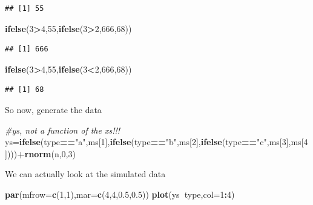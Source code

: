 \documentclass[
]{book}
\newenvironment{Shaded}{\begin{snugshade}}{\end{snugshade}}
\newcommand{\CommentTok}[1]{\textcolor[rgb]{0.56,0.35,0.01}{\textit{#1}}}
\newcommand{\DataTypeTok}[1]{\textcolor[rgb]{0.13,0.29,0.53}{#1}}
\newcommand{\DecValTok}[1]{\textcolor[rgb]{0.00,0.00,0.81}{#1}}
\newcommand{\FloatTok}[1]{\textcolor[rgb]{0.00,0.00,0.81}{#1}}
\newcommand{\KeywordTok}[1]{\textcolor[rgb]{0.13,0.29,0.53}{\textbf{#1}}}
\newcommand{\NormalTok}[1]{#1}
\newcommand{\OperatorTok}[1]{\textcolor[rgb]{0.81,0.36,0.00}{\textbf{#1}}}
\newcommand{\StringTok}[1]{\textcolor[rgb]{0.31,0.60,0.02}{#1}}
\begin{document}
\begin{verbatim}
## [1] 55
\end{verbatim}

\begin{Shaded}
\begin{Highlighting}[]
\KeywordTok{ifelse}\NormalTok{(}\DecValTok{3}\OperatorTok{>}\DecValTok{4}\NormalTok{,}\DecValTok{55}\NormalTok{,}\KeywordTok{ifelse}\NormalTok{(}\DecValTok{3}\OperatorTok{>}\DecValTok{2}\NormalTok{,}\DecValTok{666}\NormalTok{,}\DecValTok{68}\NormalTok{))}
\end{Highlighting}
\end{Shaded}

\begin{verbatim}
## [1] 666
\end{verbatim}

\begin{Shaded}
\begin{Highlighting}[]
\KeywordTok{ifelse}\NormalTok{(}\DecValTok{3}\OperatorTok{>}\DecValTok{4}\NormalTok{,}\DecValTok{55}\NormalTok{,}\KeywordTok{ifelse}\NormalTok{(}\DecValTok{3}\OperatorTok{<}\DecValTok{2}\NormalTok{,}\DecValTok{666}\NormalTok{,}\DecValTok{68}\NormalTok{))}
\end{Highlighting}
\end{Shaded}

\begin{verbatim}
## [1] 68
\end{verbatim}

So now, generate the data

\begin{Shaded}
\begin{Highlighting}[]
\CommentTok{#ys, not a function of the xs!!!}
\NormalTok{ys=}\KeywordTok{ifelse}\NormalTok{(type}\OperatorTok{==}\StringTok{"a"}\NormalTok{,ms[}\DecValTok{1}\NormalTok{],}\KeywordTok{ifelse}\NormalTok{(type}\OperatorTok{==}\StringTok{"b"}\NormalTok{,ms[}\DecValTok{2}\NormalTok{],}\KeywordTok{ifelse}\NormalTok{(type}\OperatorTok{==}\StringTok{"c"}\NormalTok{,ms[}\DecValTok{3}\NormalTok{],ms[}\DecValTok{4}\NormalTok{])))}\OperatorTok{+}\KeywordTok{rnorm}\NormalTok{(n,}\DecValTok{0}\NormalTok{,}\DecValTok{3}\NormalTok{)}
\end{Highlighting}
\end{Shaded}

We can actually look at the simulated data

\begin{Shaded}
\begin{Highlighting}[]
\KeywordTok{par}\NormalTok{(}\DataTypeTok{mfrow=}\KeywordTok{c}\NormalTok{(}\DecValTok{1}\NormalTok{,}\DecValTok{1}\NormalTok{),}\DataTypeTok{mar=}\KeywordTok{c}\NormalTok{(}\DecValTok{4}\NormalTok{,}\DecValTok{4}\NormalTok{,}\FloatTok{0.5}\NormalTok{,}\FloatTok{0.5}\NormalTok{))}
\KeywordTok{plot}\NormalTok{(ys}\OperatorTok{~}\NormalTok{type,}\DataTypeTok{col=}\DecValTok{1}\OperatorTok{:}\DecValTok{4}\NormalTok{)}
\end{Highlighting}
\end{Shaded}
\end{document}
